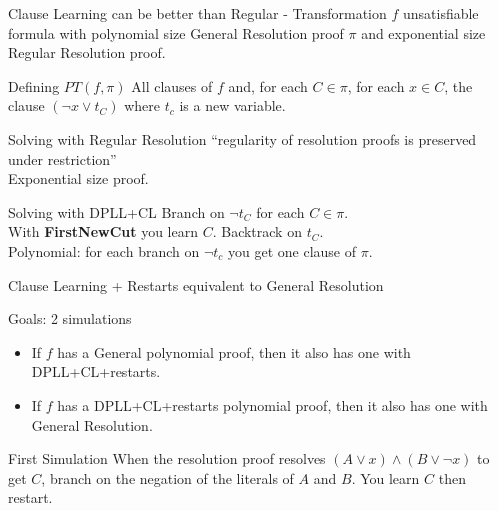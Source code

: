 \documentclass[page number]{beamer}
\begin{document}
\begin{frame}{Clause Learning can be better than Regular - Transformation}
  $f$ unsatisfiable formula with polynomial size General Resolution proof $\pi$ and exponential size Regular Resolution proof.
  \vfill
  \begin{block}{Defining $PT(f,\pi)$}
    All clauses of $f$ and, for each $C\in \pi$, for each $x\in C$, the clause $(\neg x\vee t_C)$ where $t_c$ is a new variable.
  \end{block}
  \vfill
  \begin{alertblock}{Solving with Regular Resolution}
    ``regularity of resolution proofs is preserved under restriction''\\
    Exponential size proof.
  \end{alertblock}
  \vfill
  \begin{exampleblock}{Solving with DPLL+CL}
    Branch on $\neg t_C$ for each $C\in\pi$.\\
    With \textbf{FirstNewCut} you learn $C$. Backtrack on $t_C$.\\
    Polynomial: for each branch on $\neg t_c$ you get one clause of $\pi$.
  \end{exampleblock}
    

\end{frame}

\begin{frame}{Clause Learning + Restarts equivalent to General Resolution}
  \begin{exampleblock}{Goals: 2 simulations}
    \begin{itemize}
    \item If $f$ has a General polynomial proof, then it also has one with DPLL+CL+restarts.
    \item If $f$ has a DPLL+CL+restarts polynomial proof, then it also has one with General Resolution.
    \end{itemize}
  \end{exampleblock}
  \vfill
  \begin{block}{First Simulation}
    When the resolution proof resolves $(A\vee x) \wedge (B\vee \neg x)$ to get $C$, branch on the negation of the literals of $A$ and $B$.
    You learn $C$ then restart.
  \end{block}

\end{frame}
\end{document}
